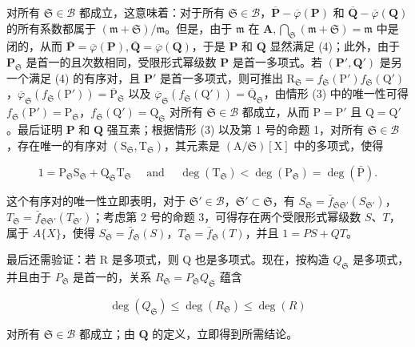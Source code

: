 对所有 \(\mathfrak{S} \in \mathcal{B}\) 都成立，这意味着：对于所有 \(\mathfrak{S} \in \mathcal{B}\)，\(\overline{\mathbf{P}} - \overline{\varphi}(\mathbf{P})\) 和 \(\overline{\mathbf{Q}} - \overline{\varphi}(\mathbf{Q})\) 的所有系数都属于 \((\mathfrak{m} + \mathfrak{S})/\mathfrak{m}\)。但是，由于 \(\mathfrak{m}\) 在 \(\mathbf{A}, \bigcap_{\mathfrak{S}} (\mathfrak{m} + \mathfrak{S}) = \mathfrak{m}\) 中是闭的，从而 \(\overline{\mathbf{P}} = \overline{\varphi}(\mathbf{P}), \overline{\mathbf{Q}} = \overline{\varphi}(\mathbf{Q})\)，于是 \(\mathbf{P}\) 和 \(\mathbf{Q}\) 显然满足 (4)；此外，由于 \(\mathbf{P}_{\mathfrak{S}}\) 是首一的且次数相同，受限形式幂级数 \(\mathbf{P}\) 是首一多项式。若 \((\mathbf{P}', \mathbf{Q}')\) 是另一个满足 (4) 的有序对，且 \(\mathbf{P}'\) 是首一多项式，则可推出 \(\mathrm{R}_{\mathfrak{S}} = f_{\mathfrak{S}}(\mathrm{P}') f_{\mathfrak{S}}(\mathrm{Q}')\)，\(\overline{\varphi}_{\mathfrak{S}}(f_{\mathfrak{S}}(\mathrm{P}')) = \overline{\mathrm{P}}_{\mathfrak{S}}\) 以及 \(\overline{\varphi}_{\mathfrak{S}}(f_{\mathfrak{S}}(\mathrm{Q}')) = \overline{\mathrm{Q}}_{\mathfrak{S}}\)，由情形 (3) 中的唯一性可得 \(f_{\mathfrak{S}}(\mathrm{P}') = \mathrm{P}_{\mathfrak{S}}\)，\(f_{\mathfrak{S}}(\mathrm{Q}') = \mathrm{Q}_{\mathfrak{S}}\) 对所有 \(\mathfrak{S} \in \mathcal{B}\) 都成立，从而 \(\mathrm{P} = \mathrm{P}'\) 且 \(\mathrm{Q} = \mathrm{Q}'\)。最后证明 \(\mathbf{P}\) 和 \(\mathbf{Q}\) 强互素；根据情形 (3) 以及第 1 号的命题 1，对所有 \(\mathfrak{S} \in \mathcal{B}\)，存在唯一的有序对 \((\mathrm{S}_{\mathfrak{S}}, \mathrm{T}_{\mathfrak{S}})\)，其元素是 \((\mathrm{A}/\mathfrak{S})[\mathrm{X}]\) 中的多项式，使得

\[
1 = \mathrm{P} _ {\mathfrak {S}} \mathrm{S} _ {\mathfrak {S}} + \mathrm{Q} _ {\mathfrak {S}} \mathrm{T} _ {\mathfrak {S}} \quad \text { and } \quad \deg (\mathrm{T} _ {\mathfrak {S}}) <   \deg (\mathrm{P} _ {\mathfrak {S}}) = \deg (\bar {\mathrm{P}}).\tag{7}
\]

这个有序对的唯一性立即表明，对于 \(\mathfrak{S}' \in \mathcal{B}\)，\(\mathfrak{S}' \subset \mathfrak{S}\)，有 \(S_{\mathfrak{S}} = \bar{f}_{\mathfrak{S}\mathfrak{S}'}(S_{\mathfrak{S}'})\)，\(T_{\mathfrak{S}} = \bar{f}_{\mathfrak{S}\mathfrak{S}'}(T_{\mathfrak{S}'})\)；考虑第 2 号的命题 3，可得存在两个受限形式幂级数 \(S\)、\(T\)，属于 \(A\{X\}\)，使得 \(S_{\mathfrak{S}} = \bar{f}_{\mathfrak{S}}(S)\)，\(T_{\mathfrak{S}} = \bar{f}_{\mathfrak{S}}(T)\)，并且 \(1 = PS + QT\)。

最后还需验证：若 R 是多项式，则 Q 也是多项式。现在，按构造 \(Q_{\mathfrak{S}}\) 是多项式，并且由于 \(P_{\mathfrak{S}}\) 是首一的，关系 \(R_{\mathfrak{S}} = P_{\mathfrak{S}}Q_{\mathfrak{S}}\) 蕴含

\[
\deg (Q _ {\mathfrak {S}}) \leqslant \deg (R _ {\mathfrak {S}}) \leqslant \deg (R)
\]

对所有 \(\mathfrak{S} \in \mathcal{B}\) 都成立；由 \(\mathbf{Q}\) 的定义，立即得到所需结论。
